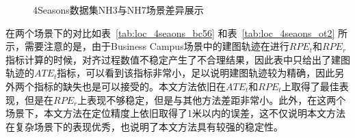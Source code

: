 \begin{figure}
  \centering
  \caption{4Seasons数据集NH3与NH7场景差异展示}
  \label{fig:scene_bcot}
\end{figure}

在两个场景下的对比如表~\ref{tab:loc_4seaons_bc56} 和表~\ref{tab:loc_4seaons_ot2} 所示，需要注意的是，由于Business Campus场景中的建图轨迹在进行$RPE_t$和$RPE_r$指标计算的时候，对齐过程数值不稳定产生了不合理结果，因此表中只给出了建图轨迹的$ATE_t$指标，可以看到该指标非常小，足以说明建图轨迹较为精确，因此另外两个指标的缺失也是可以接受的。本文方法依旧在$ATE_t$和$RPE_t$上取得了最佳表现，但是在$RPE_r$上表现不够稳定，但是与其他方法差距非常小。此外，在这两个场景下，本文方法在定位精度上依旧取得了1米以内的误差，这不仅说明本文方法在复杂场景下的表现优秀，也说明了本文方法具有较强的稳定性。

